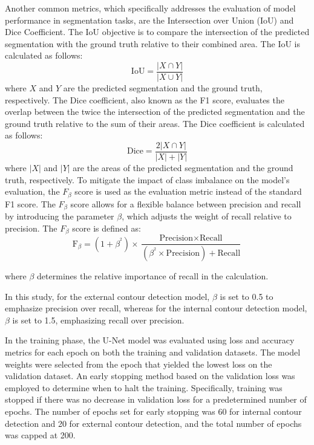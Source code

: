 \documentclass{ieeeaccess}
\begin{document}
Another common metrics, which specifically addresses the evaluation of model performance in segmentation tasks, are the Intersection over Union (IoU) and Dice Coefficient.
The IoU objective is to compare the intersection of the predicted segmentation with the ground truth relative to their combined area. The IoU is calculated as follows:
\begin{equation}
\text{IoU} = \frac{|X \cap Y|}{|X \cup Y|}
\end{equation}
where $X$ and $Y$ are the predicted segmentation and the ground truth, respectively.
The Dice coefficient, also known as the F1 score, evaluates the overlap between the twice the intersection of the predicted segmentation and the ground truth relative to the sum of their areas. The Dice coefficient is calculated as follows:
\begin{equation}
\text{Dice} = \frac{2|X \cap Y|}{|X| + |Y|}
\end{equation}
where $|X|$ and $|Y|$ are the areas of the predicted segmentation and the ground truth, respectively.
To mitigate the impact of class imbalance on the model's evaluation, the \( F_{\beta} \) score is used as the evaluation metric instead of the standard F1 score. The \( F_{\beta} \) score allows for a flexible balance between precision and recall by introducing the parameter \(\beta\), which adjusts the weight of recall relative to precision.
The \( F_{\beta} \) score is defined as:
\[
\text{F}_{\beta} = (1 + \beta^{^2}) \times \frac{\text{Precision} \times \text{Recall}}{(\beta^{^2} \times \text{Precision}) + \text{Recall}}
\]


where \(\beta\) determines the relative importance of recall in the calculation.


In this study, for the external contour detection model, \(\beta\) is set to 0.5 to emphasize precision over recall, whereas for the internal contour detection model, \(\beta\) is set to 1.5, emphasizing recall over precision.

In the training phase, the U-Net model was evaluated using loss and accuracy metrics for each epoch on both the training and validation datasets.
The model weights were selected from the epoch that yielded the lowest loss on the validation dataset.
An early stopping method based on the validation loss was employed to determine when to halt the training.
Specifically, training was stopped if there was no decrease in validation loss for a predetermined number of epochs.
The number of epochs set for early stopping was 60 for internal contour detection and 20 for external contour detection, and the total number of epochs was capped at 200.
\end{document}
